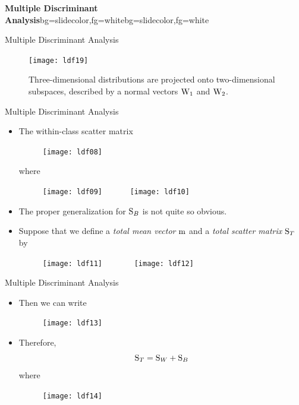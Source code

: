 \begin{frame}{}
\begin{variableblock}{\centering \Large \textbf{\vspace{4pt}\newline Multiple Discriminant Analysis\vspace{4pt}}}{bg=slidecolor,fg=white}{bg=slidecolor,fg=white}
\end{variableblock}
\end{frame}


\begin{frame}{Multiple Discriminant Analysis}
\begin{figure}
\texttt{[image: ldf19]}
\caption{Three-dimensional distributions are projected onto two-dimensional subspaces, described by a normal vectors ${\rm W}_1$ and ${\rm W}_2$.}
\end{figure}
\end{frame}


\begin{frame}{Multiple Discriminant Analysis}
\begin{itemize}
\item The within-class scatter matrix
\begin{figure}
\texttt{[image: ldf08]}
\end{figure}
where\\
\begin{figure}
\texttt{[image: ldf09]}~~~~~~
\texttt{[image: ldf10]}
\end{figure}
\item The proper generalization for ${\rm S}_B$ is not quite so obvious.
\item Suppose that we define a \textit{\color{mycolor2}total mean vector} ${\rm m}$ and a \textit{\color{mycolor2}total scatter matrix} ${\rm S}_T$ by
\begin{figure}
\texttt{[image: ldf11]}~~~~~~~
\texttt{[image: ldf12]}
\end{figure}
\end{itemize}
\end{frame}

\begin{frame}{Multiple Discriminant Analysis}
\begin{itemize}
\item Then we can write
\begin{figure}
\texttt{[image: ldf13]}
\end{figure}
\item Therefore,
\begin{equation}
{\rm S}_T={\rm S}_{W}+{\rm S}_{B}\nonumber
\end{equation}
where 
\begin{figure}
\texttt{[image: ldf14]}
\end{figure}
\end{itemize}
\end{frame}

